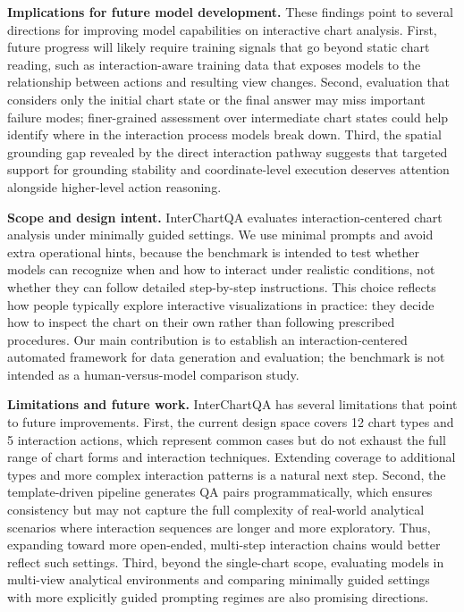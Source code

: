 \documentclass[review,journal,hideappendix]{vgtc} %
\begin{document}
\vspace{1.2mm}\noindent\textbf{Implications for future model development.} These findings point to several directions for improving model capabilities on interactive chart analysis. First, future progress will likely require training signals that go beyond static chart reading, such as interaction-aware training data that exposes models to the relationship between actions and resulting view changes. Second, evaluation that considers only the initial chart state or the final answer may miss important failure modes; finer-grained assessment over intermediate chart states could help identify where in the interaction process models break down. Third, the spatial grounding gap revealed by the direct interaction pathway suggests that targeted support for grounding stability and coordinate-level execution deserves attention alongside higher-level action reasoning.

\vspace{1.2mm}\noindent\textbf{Scope and design intent.} InterChartQA evaluates interaction-centered chart analysis under minimally guided settings. We use minimal prompts and avoid extra operational hints, because the benchmark is intended to test whether models can recognize when and how to interact under realistic conditions, not whether they can follow detailed step-by-step instructions. This choice reflects how people typically explore interactive visualizations in practice: they decide how to inspect the chart on their own rather than following prescribed procedures. Our main contribution is to establish an interaction-centered automated framework for data generation and evaluation; the benchmark is not intended as a human-versus-model comparison study.

\vspace{1.2mm}\noindent\textbf{Limitations and future work.} InterChartQA has several limitations that point to future improvements. First, the current design space covers 12 chart types and 5 interaction actions, which represent common cases but do not exhaust the full range of chart forms and interaction techniques. Extending coverage to additional types and more complex interaction patterns is a natural next step. Second, the template-driven pipeline generates QA pairs programmatically, which ensures consistency but may not capture the full complexity of real-world analytical scenarios where interaction sequences are longer and more exploratory. Thus, expanding toward more open-ended, multi-step interaction chains would better reflect such settings. Third, beyond the single-chart scope, evaluating models in multi-view analytical environments and comparing minimally guided settings with more explicitly guided prompting regimes are also promising directions.
\end{document}
